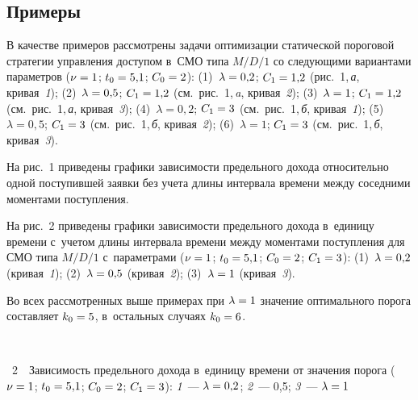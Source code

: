 \begin{multicols}{2}
\section{Примеры}

  В качестве примеров рассмотрены задачи оптимизации статической
пороговой стратегии управления доступом в~СМО типа $M/D/1$ со
следующими вариантами параметров ($\nu\hm=1$; $t_0\hm=5{,}1$; $C_0\hm=2$):
 (1)~$\lambda\hm=0{,}2$; $C_1\hm= 1{,}2$ (рис.~1,\,\textit{а}, кривая~\textit{1});
  (2)~$\lambda\hm= 0{,}5$; $C_1\hm= 1{,}2$ (см.\ рис.~1,\,\textit{a}, кривая~\textit{2});
  (3)~$\lambda\hm=1$;  $C_1\hm=
1{,}2$ (см.\ рис.~1,\,\textit{а}, кривая~\textit{3});
  (4)~$\lambda=0{,}2$;  $C_1\hm= 3$
(см.\ рис.~1,\,\textit{б}, кривая~\textit{1});
  (5)~$\lambda=0{,}5$; $C_1\hm=3$
(см.\ рис.~1,\,\textit{б}, кривая~\textit{2});
  (6)~$\lambda=1$;  $C_1\hm=3$
(см.\ рис.~1,\,\textit{б}, кривая~\textit{3}).

  На рис.~1 приведены графики зависимости предельного дохода
относительно одной поступившей заявки без учета длины интервала времени
между соседними моментами поступления.
     
  На рис.~2 приведены графики зависимости предельного дохода в~единицу
времени с~учетом длины интервала времени между моментами поступления для СМО типа $M/D/1$ 
с~параметрами ($\nu\hm=1$; $t_0\hm=5{,}1$; $C_0\hm=2$; $C_1\hm=3$):
(1)~$\lambda\hm=0{,}2$ (кривая~\textit{1}); (2)~$\lambda\hm=0{,}5$ 
(кривая~\textit{2}); (3)~$\lambda\hm=1$ (кривая~\textit{3}).
      
  Во всех рассмотренных выше примерах при $\lambda\hm=1$ значение
оптимального порога составляет $k_0\hm=5$, в~остальных случаях $k_0\hm=6$.

\begin{center}  %
\vspace*{5pt}
\mbox{%
 \epsfxsize=78.026mm
 }

\end{center}

\vspace*{-2pt}

\noindent
{{\figurename~2}\ \ \small{Зависимость предельного дохода в~единицу времени 
от значения порога ($\nu\hm=1$; $t_0\hm=5{,}1$; $C_0\hm=2$; $C_1\hm=3$):
\textit{1}~--- $\lambda\hm=0{,}2$; \textit{2}~--- 0,5; \textit{3}~--- $\lambda\hm=1$}}


\end{multicols}
